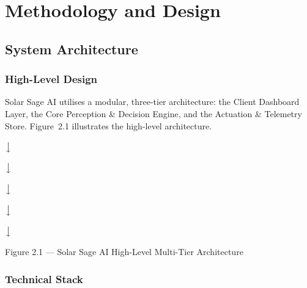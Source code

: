 \documentclass[12pt]{report}
\newcommand{\flowarrow}{\par\centering$\big\downarrow$\par}
\begin{document}
\chapter{Methodology and Design}

\section{System Architecture}

\subsection{High-Level Design}

Solar Sage AI utilises a modular, three-tier architecture: the Client Dashboard Layer, the Core Perception \& Decision Engine, and the Actuation \& Telemetry Store. Figure~2.1 illustrates the high-level architecture.

\begin{center}
\begin{minipage}{0.85\linewidth}
\centering
{}
\flowarrow
{}
\flowarrow
{}
\flowarrow
{}
\flowarrow
{}
\flowarrow
{}
\end{minipage}
\end{center}
\begin{center}
\small Figure 2.1 --- Solar Sage AI High-Level Multi-Tier Architecture
\end{center}

\subsection{Technical Stack}
\end{document}
